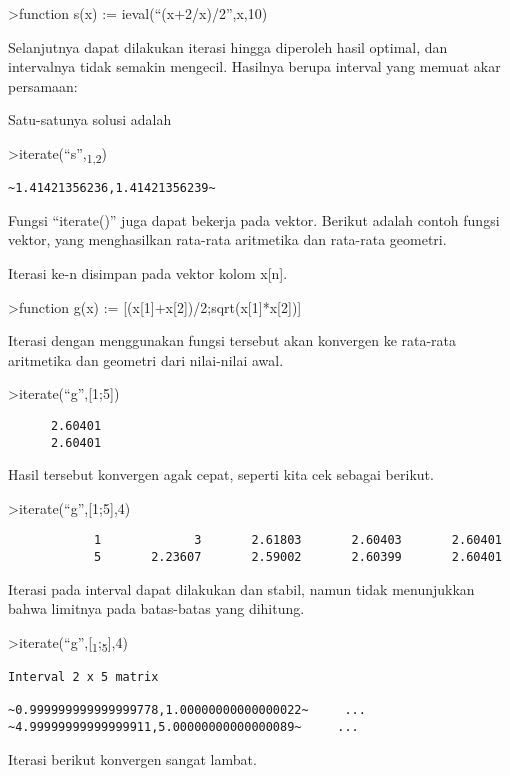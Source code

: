 \documentclass[
]{book}
\begin{document}
\textgreater function s(x) := ieval(``(x+2/x)/2'',x,10)

Selanjutnya dapat dilakukan iterasi hingga diperoleh hasil optimal, dan intervalnya tidak semakin mengecil. Hasilnya berupa interval yang memuat akar persamaan:

Satu-satunya solusi adalah

\textgreater iterate(``s'',\textsubscript{1,2})

\begin{verbatim}
~1.41421356236,1.41421356239~
\end{verbatim}

Fungsi ``iterate()'' juga dapat bekerja pada vektor. Berikut adalah contoh fungsi vektor, yang menghasilkan rata-rata aritmetika dan rata-rata geometri.

Iterasi ke-n disimpan pada vektor kolom x{[}n{]}.

\textgreater function g(x) := {[}(x{[}1{]}+x{[}2{]})/2;sqrt(x{[}1{]}*x{[}2{]}){]}

Iterasi dengan menggunakan fungsi tersebut akan konvergen ke rata-rata aritmetika dan geometri dari nilai-nilai awal.

\textgreater iterate(``g'',{[}1;5{]})

\begin{verbatim}
      2.60401 
      2.60401 
\end{verbatim}

Hasil tersebut konvergen agak cepat, seperti kita cek sebagai berikut.

\textgreater iterate(``g'',{[}1;5{]},4)

\begin{verbatim}
            1             3       2.61803       2.60403       2.60401 
            5       2.23607       2.59002       2.60399       2.60401 
\end{verbatim}

Iterasi pada interval dapat dilakukan dan stabil, namun tidak menunjukkan bahwa limitnya pada batas-batas yang dihitung.

\textgreater iterate(``g'',{[}\textsubscript{1};\textsubscript{5}{]},4)

\begin{verbatim}
Interval 2 x 5 matrix

~0.999999999999999778,1.00000000000000022~     ...
~4.99999999999999911,5.00000000000000089~     ...
\end{verbatim}

Iterasi berikut konvergen sangat lambat.
\end{document}
